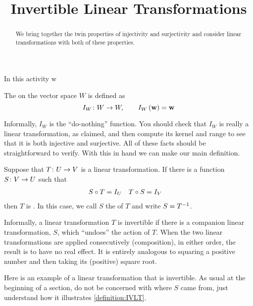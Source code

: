 \documentclass{ximera}
\title{Invertible Linear Transformations}
\begin{document}
\begin{abstract}
  We bring together the twin properties of injectivity and
  surjectivity and consider linear transformations with both of these
  properties.
\end{abstract}
\maketitle

In this activity w

\begin{definition}

The  on the vector space $W$ is defined as
\[
I_W\colon W\rightarrow W,\quad\quad I_W\left(\mathbf{w}\right)=\mathbf{w}
\]

\end{definition}

Informally, $I_W$ is the ``do-nothing'' function.  You should check that $I_W$ is really a linear transformation, as claimed, and then compute its kernel and range to see that it is both injective and surjective.  All of these facts should be straightforward to verify.  With this in hand we can make our main definition.


\begin{definition}
Suppose that $T\colon U\rightarrow V$ is a linear transformation.  If there is a function $S\colon V\rightarrow U$ such that
\begin{align*}
{S}\circ{T}&=I_U & {T}\circ{S}&=I_V
\end{align*}
then $T$ is .  In this case, we call $S$ the  of $T$ and write $S=T^{-1}$.

\end{definition}

Informally, a linear transformation $T$ is invertible if there is a companion linear transformation, $S$, which ``undoes'' the action of $T$.  When the two linear transformations are applied consecutively (composition), in either order, the result is to have no real effect.  It is entirely analogous to squaring a positive number and then taking its (positive) square root.



Here is an example of a linear transformation that is invertible.  As usual at the beginning of a section, do not be concerned with where $S$ came from, just understand how it illustrates \ref{definition:IVLT}.
\end{document}
